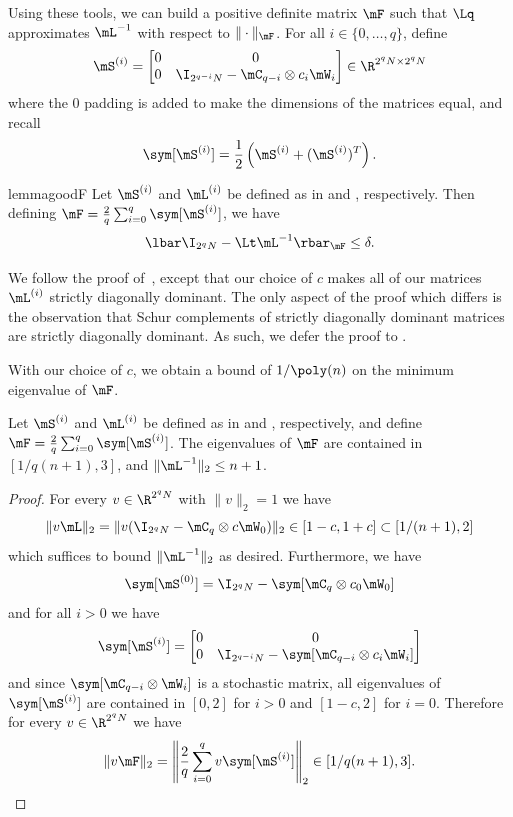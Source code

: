 \documentclass{toc}
\begin{document}
Using these tools, we can build a positive definite matrix $\mF$ such that $\Lq$ approximates $\mL^{-1}$ with respect to $\|\cdot\|_{\mF}$.
For all $i\in \{0,\ldots,q\}$, define 
\begin{equation}
    \mS^{(i)}=\begin{bmatrix}0 & 0\\ 0 & \I_{2^{q-i}N}-\mC_{q-i}\otimes c_{i}\mW_i \end{bmatrix} \in \R^{2^qN\times 2^qN}\label{eqn:Sdecomp}
\end{equation}
where the $0$ padding is added to make the dimensions of the matrices equal, and recall
\[\sym[\mS^{(i)}] = \frac{1}{2}\left(\mS^{(i)}+(\mS^{(i)})^T\right).\]

\begin{restatable}{lemma}{goodF}\label{lem:goodF}
Let $\mS^{(i)}$ and $\mL^{(i)}$ be defined as in  and , respectively. %
Then defining
$\mF=\frac{2}{q}\sum_{i=0}^q\sym[\mS^{(i)}]$, we have %
$$\lbar \I_{2^qN}-\Lt\mL^{-1}\rbar_\mF\leq \delta.$$
\end{restatable}
We follow the proof of~\cite{AhmadinejadKeMuPeSiVa19}, except that our choice of $c$ makes all of our matrices $\mL^{(i)}$ %
strictly diagonally dominant. The only aspect of the proof which differs is the observation that Schur complements of strictly diagonally dominant matrices are strictly diagonally dominant. As such, we defer the proof to .

With our choice of $c$, we obtain a bound of $1/\poly(n)$ on the minimum eigenvalue of $\mF$.
\begin{lemma}\label{lem:condF}
Let $\mS^{(i)}$ and $\mL^{(i)}$ be defined as in  and , respectively, %
and define
$\mF=\frac{2}{q}\sum_{i=0}^q\sym[\mS^{(i)}]$. The eigenvalues of $\mF$ are contained in $[1/q(n+1),3]$, and $\|\mL^{-1}\|_2\leq n+1$.
\end{lemma}
\begin{proof}
For every $v \in \R^{2^qN}$ with $\|v\|_2=1$ we have  
\[\|v\mL\|_2=\|v(\I_{2^qN}- \mC_q\otimes c\mW_0)\|_2 \in [1-c,1+c]\subset[1/(n+1),2]\]
which suffices to bound $\|\mL^{-1}\|_2$ as desired. Furthermore, we have
\[\sym[\mS^{(0)}]=\I_{2^{q}N}-\sym[\mC_{q}\otimes c_{0}\mW_0]\]
and for all $i>0$ we have
\[\sym[\mS^{(i)}]=\begin{bmatrix}0 & 0\\ 0 & \I_{2^{q-i}N}-\sym[\mC_{q-i}\otimes c_{i}\mW_i] \end{bmatrix}\]
and since $\sym[\mC_{q-i}\otimes \mW_i]$ is a stochastic matrix, all eigenvalues of $\sym[\mS^{(i)}]$ are contained in $[0,2]$ for $i>0$ and $[1-c,2]$ for $i=0$. Therefore for every $v\in \R^{2^qN}$ we have
\[\|v\mF\|_2=\left\|\frac{2}{q}\sum_{i=0}^q v\sym[\mS^{(i)}]\right\|_2 \in [1/q(n+1),3]. \qedhere\] 
\end{proof}
\end{document}
